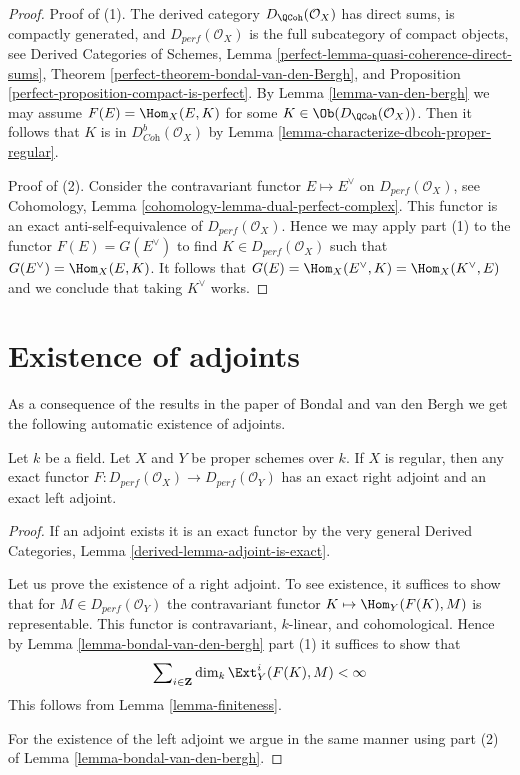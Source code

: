\begin{proof}
Proof of (1). The derived category $D_\QCoh(\mathcal{O}_X)$ has direct sums,
is compactly generated, and $D_{perf}(\mathcal{O}_X)$ is the full subcategory
of compact objects, see
Derived Categories of Schemes, Lemma
\ref{perfect-lemma-quasi-coherence-direct-sums},
Theorem \ref{perfect-theorem-bondal-van-den-Bergh}, and
Proposition \ref{perfect-proposition-compact-is-perfect}.
By Lemma \ref{lemma-van-den-bergh} we may assume
$F(E) = \Hom_X(E, K)$ for some $K \in \Ob(D_\QCoh(\mathcal{O}_X))$.
Then it follows that $K$ is in $D^b_{\textit{Coh}}(\mathcal{O}_X)$
by Lemma \ref{lemma-characterize-dbcoh-proper-regular}.

\medskip\noindent
Proof of (2). Consider the contravariant functor $E \mapsto E^\vee$
on $D_{perf}(\mathcal{O}_X)$, see
Cohomology, Lemma \ref{cohomology-lemma-dual-perfect-complex}.
This functor is an exact anti-self-equivalence of $D_{perf}(\mathcal{O}_X)$.
Hence we may apply part (1) to the functor $F(E) = G(E^\vee)$ to find
$K \in D_{perf}(\mathcal{O}_X)$ such that $G(E^\vee) = \Hom_X(E, K)$.
It follows that $G(E) = \Hom_X(E^\vee, K) = \Hom_X(K^\vee, E)$
and we conclude that taking $K^\vee$ works.
\end{proof}






\section{Existence of adjoints}
\label{section-adjoints}

\noindent
As a consequence of the results in the paper of Bondal and van den Bergh
we get the following automatic existence of adjoints.

\begin{lemma}
\label{lemma-always-right-adjoints}
Let $k$ be a field. Let $X$ and $Y$ be proper schemes over $k$.
If $X$ is regular, then any exact functor
$F : D_{perf}(\mathcal{O}_X) \to D_{perf}(\mathcal{O}_Y)$
has an exact right adjoint and an exact left adjoint.
\end{lemma}

\begin{proof}
If an adjoint exists it is an exact functor by the very general
Derived Categories, Lemma \ref{derived-lemma-adjoint-is-exact}.

\medskip\noindent
Let us prove the existence of a right adjoint.
To see existence, it suffices to show that for
$M \in D_{perf}(\mathcal{O}_Y)$ the contravariant functor
$K \mapsto \Hom_Y(F(K), M)$ is representable.
This functor is contravariant, $k$-linear, and cohomological.
Hence by Lemma \ref{lemma-bondal-van-den-bergh} part (1)
it suffices to show that
$$
\sum\nolimits_{i \in \mathbf{Z}} \dim_k \Ext^i_Y(F(K), M) < \infty
$$
This follows from Lemma \ref{lemma-finiteness}.

\medskip\noindent
For the existence of the left adjoint we argue in the same
manner using part (2) of Lemma \ref{lemma-bondal-van-den-bergh}.
\end{proof}






